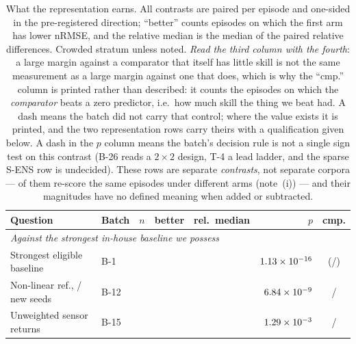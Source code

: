 \documentclass[review]{elsarticle}
\begin{document}
\begin{table}[!htbp]
\centering
\caption{What the representation earns. All contrasts are paired per episode and
one-sided in the pre-registered direction; ``better'' counts episodes on which the
first arm has lower nRMSE, and the relative median is the median of the paired
relative differences. Crowded stratum unless noted. \emph{Read the third column
with the fourth}: a large margin against a comparator that itself has little skill
is not the same measurement as a large margin against one that does, which is why
the ``cmp.'' column is printed rather than described: it counts the episodes on
which the \emph{comparator} beats a zero predictor, i.e.\ how much skill the thing
we beat had. A dash means the batch did not carry that control; where the value
exists it is printed, and the two representation rows carry theirs with a
qualification given below. A dash in the
$p$ column means the batch's decision rule is not a single sign test on this
contrast (B-26 reads a $2\times2$ design, T-4 a lead ladder, and the sparse S-ENS row
is undecided).
These rows are separate
\emph{contrasts}, not separate corpora --- \HosSameN{} of them re-score the same
\AblationEps{} episodes under different arms (note~(i)) --- and their magnitudes have
no defined meaning when added or subtracted.}
\label{tab:earns}
\footnotesize
\setlength{\tabcolsep}{4pt}
\begin{tabular}{llccrrc}
\toprule
Question & Batch & $n$ & better & rel.\ median & $p$ & cmp. \\
\midrule
\multicolumn{7}{l}{\emph{Against the strongest in-house baseline we possess}} \\
Strongest eligible baseline & B-1  & \BOneN{}    & \BOneBetter{}    & \BOneRel{}    & $1.13\times 10^{-16}{}$ & (\BOneCmp{}/\BOneCmpN{}) \\
Non-linear ref., \BTwelveFreshSeeds{}/\BTwelveSeeds{} new seeds & B-12 & \BTwelveN{} & \BTwelveBetter{} & \BTwelveRel{} & $6.84\times 10^{-9}{}$ & \BTwelveCmpBetter{}/\BTwelveCmpN{} \\
Unweighted sensor returns & B-15 & \BFifteenN{} & \BFifteenBetter{} & \BFifteenRel{} & $1.29\times 10^{-3}{}$ & \BFifteenCmp{}/\BFifteenN{} \\

\end{tabular}
\end{table}
\end{document}
